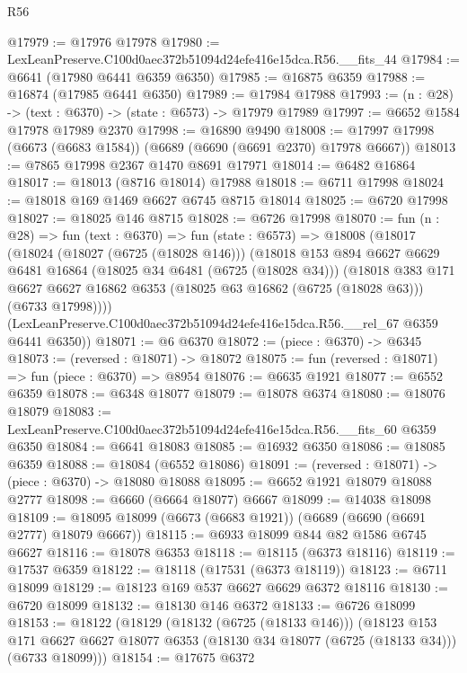 \begin{lexlean}{R56}
\begin{coremodule}
@17979 := @17976 @17978
@17980 := LexLeanPreserve.C100d0aec372b51094d24efe416e15dca.R56.__fits_44
@17984 := @6641 (@17980 @6441 @6359 @6350)
@17985 := @16875 @6359
@17988 := @16874 (@17985 @6441 @6350)
@17989 := @17984 @17988
@17993 := (n : @28) -> (text : @6370) -> (state : @6573) -> @17979 @17989
@17997 := @6652 @1584 @17978 @17989 @2370
@17998 := @16890 @9490
@18008 := @17997 @17998 (@6673 (@6683 @1584)) (@6689 (@6690 (@6691 @2370) @17978 @6667))
@18013 := @7865 @17998 @2367 @1470 @8691 @17971
@18014 := @6482 @16864
@18017 := @18013 (@8716 @18014) @17988
@18018 := @6711 @17998
@18024 := @18018 @169 @1469 @6627 @6745 @8715 @18014
@18025 := @6720 @17998
@18027 := @18025 @146 @8715
@18028 := @6726 @17998
@18070 := fun (n : @28) =>
  fun (text : @6370) =>
  fun (state : @6573) =>
  @18008
    (@18017
      (@18024
        (@18027 (@6725 (@18028 @146)))
        (@18018
          @153
          @894
          @6627
          @6629
          @6481
          @16864
          (@18025 @34 @6481 (@6725 (@18028 @34)))
          (@18018
            @383
            @171
            @6627
            @6627
            @16862
            @6353
            (@18025 @63 @16862 (@6725 (@18028 @63)))
            (@6733 @17998))))
      (LexLeanPreserve.C100d0aec372b51094d24efe416e15dca.R56.__rel_67 @6359 @6441 @6350))
@18071 := @6 @6370
@18072 := (piece : @6370) -> @6345
@18073 := (reversed : @18071) -> @18072
@18075 := fun (reversed : @18071) => fun (piece : @6370) => @8954
@18076 := @6635 @1921
@18077 := @6552 @6359
@18078 := @6348 @18077
@18079 := @18078 @6374
@18080 := @18076 @18079
@18083 := LexLeanPreserve.C100d0aec372b51094d24efe416e15dca.R56.__fits_60 @6359 @6350
@18084 := @6641 @18083
@18085 := @16932 @6350
@18086 := @18085 @6359
@18088 := @18084 (@6552 @18086)
@18091 := (reversed : @18071) -> (piece : @6370) -> @18080 @18088
@18095 := @6652 @1921 @18079 @18088 @2777
@18098 := @6660 (@6664 @18077) @6667
@18099 := @14038 @18098
@18109 := @18095 @18099 (@6673 (@6683 @1921)) (@6689 (@6690 (@6691 @2777) @18079 @6667))
@18115 := @6933 @18099 @844 @82 @1586 @6745 @6627
@18116 := @18078 @6353
@18118 := @18115 (@6373 @18116)
@18119 := @17537 @6359
@18122 := @18118 (@17531 (@6373 @18119))
@18123 := @6711 @18099
@18129 := @18123 @169 @537 @6627 @6629 @6372 @18116
@18130 := @6720 @18099
@18132 := @18130 @146 @6372
@18133 := @6726 @18099
@18153 := @18122
    (@18129
      (@18132 (@6725 (@18133 @146)))
      (@18123
        @153
        @171
        @6627
        @6627
        @18077
        @6353
        (@18130 @34 @18077 (@6725 (@18133 @34)))
        (@6733 @18099)))
@18154 := @17675 @6372

\end{coremodule}
\end{lexlean}

